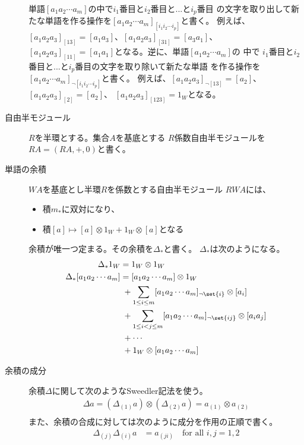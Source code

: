 \begin{description}
	単語$[a_1a_2\cdots a_m]$の中で$i_1$番目と$i_2$番目と...と$i_p$番目
	の文字を取り出して新たな単語を作る操作を$
	[a_1a_2\cdots a_m]_{[i_1i_2\cdots i_p]}$と書く。
	例えば、$[a_1a_2a_3]_{[13]}=[a_1a_3]$、$[a_1a_2a_3]_{[31]}=[a_3a_1]$、
	$[a_1a_2a_3]_{[11]}=[a_1a_1]$となる。逆に、単語$[a_1a_2\cdots a_m]$の
	中で $i_1$番目と$i_2$番目と...と$i_p$番目の文字を取り除いて新たな単語
	を作る操作を$[a_1a_2\cdots a_m]_{\neg[i_1i_2\cdots i_p]}$と書く。
	例えば、$[a_1a_2a_3]_{\neg[13]}=[a_2]$、$[a_1a_2a_3]_{[2]}=[a_2]$、
	$[a_1a_2a_3]_{[123]}=1_W$となる。
	\item[自由半モジュール]$R$を半環とする。集合$A$を基底とする
	$R$係数自由半モジュールを$RA=(RA,+,0)$と書く。
	\item[単語の余積]$WA$を基底とし半環$R$を係数とする自由半モジュール
	$RWA$には、
	\begin{itemize} %
		\item 積$m_*$に双対になり、
		\item 積$[a]\mapsto [a]\otimes1_W+1_W\otimes[a]$となる
	\end{itemize} %
	余積が唯一つ定まる。その余積を$\Delta_*$と書く。
	$\Delta_*$は次のようになる。
	\begin{equation*}\begin{split} %
		\Delta_*1_W &= 1_W\otimes1_W \\
		\Delta_*[a_1a_2\cdots a_m] 
		&= [a_1a_2\cdots a_m]\otimes1_W \\
		&\;+ \sum_{1\le i\le m}[a_1a_2\cdots a_m]_{\neg\set{i}}\otimes[a_i] \\
		&\;+ \sum_{1\le i<j\le m}[a_1a_2\cdots a_m]_{\neg\set{ij}}\otimes[a_ia_j] \\
		&\;+ \cdots \\
		&\;+ 1_W\otimes[a_1a_2\cdots a_m] \\
	\end{split}\end{equation*} %
	\item[余積の成分]余積$\Delta$に関して次のようなSweedler記法を使う。
	\begin{equation*}\begin{split} %
		\Delta a = (\Delta_{(1)}a)\otimes(\Delta_{(2)}a)
		= a_{(1)}\otimes a_{(2)} \\
	\end{split}\end{equation*} %
	また、余積の合成に対しては次のように成分を作用の正順で書く。
	\begin{equation*}\begin{split} %
		\Delta_{(j)}\Delta_{(i)}a &= a_{(ji)} \quad\text{for all }i,j=1,2 \\

\end{split}
\end{equation*}
\end{description}
